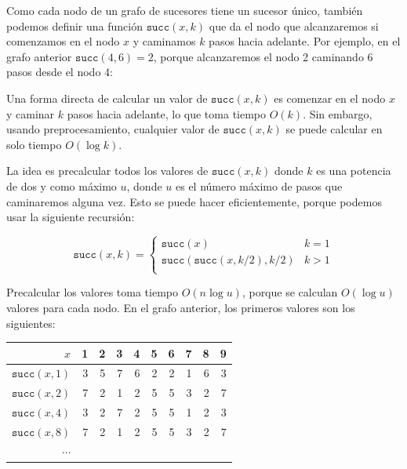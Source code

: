 Como cada nodo de un grafo de sucesores tiene un
sucesor único, también podemos definir una función $\texttt{succ}(x,k)$
que da el nodo que alcanzaremos si
comenzamos en el nodo $x$ y caminamos $k$ pasos hacia adelante.
Por ejemplo, en el grafo anterior $\texttt{succ}(4,6)=2$,
porque alcanzaremos el nodo 2 caminando 6 pasos desde el nodo 4:

\begin{center}
\end{center}

Una forma directa de calcular un valor de $\texttt{succ}(x,k)$
es comenzar en el nodo $x$ y caminar $k$ pasos hacia adelante, lo que toma tiempo $O(k)$.
Sin embargo, usando preprocesamiento, cualquier valor de $\texttt{succ}(x,k)$
se puede calcular en solo tiempo $O(\log k)$.

La idea es precalcular todos los valores de $\texttt{succ}(x,k)$ donde
$k$ es una potencia de dos y como máximo $u$, donde $u$ es
el número máximo de pasos que caminaremos alguna vez.
Esto se puede hacer eficientemente, porque
podemos usar la siguiente recursión:

\begin{equation*}
    \texttt{succ}(x,k) = \begin{cases}
               \texttt{succ}(x)              & k = 1\\
               \texttt{succ}(\texttt{succ}(x,k/2),k/2)   & k > 1\\
           \end{cases}
\end{equation*}

Precalcular los valores toma tiempo $O(n \log u)$,
porque se calculan $O(\log u)$ valores para cada nodo.
En el grafo anterior, los primeros valores son los siguientes:

\begin{center}
\begin{tabular}{r|rrrrrrrrr}
$x$ & 1 & 2 & 3 & 4 & 5 & 6 & 7 & 8 & 9 \\
\hline
$\texttt{succ}(x,1)$ & 3 & 5 & 7 & 6 & 2 & 2 & 1 & 6 & 3 \\
$\texttt{succ}(x,2)$ & 7 & 2 & 1 & 2 & 5 & 5 & 3 & 2 & 7 \\
$\texttt{succ}(x,4)$ & 3 & 2 & 7 & 2 & 5 & 5 & 1 & 2 & 3 \\
$\texttt{succ}(x,8)$ & 7 & 2 & 1 & 2 & 5 & 5 & 3 & 2 & 7 \\
$\cdots$ \\
\end{tabular}
\end{center}

